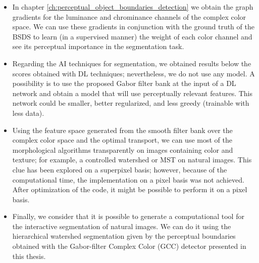 \begin{itemize}
	 \item In chapter \ref{ch:perceptual_object_boundaries_detection} we obtain the graph gradients for the luminance and chrominance channels of the complex color space. We can use these gradients in conjunction with the ground truth of the BSDS to learn (in a supervised manner) the weight of each color channel and see its perceptual importance in the segmentation task.
	 
	 \item Regarding the AI techniques for segmentation, we obtained results below the scores obtained with DL techniques; nevertheless, we do not use any model. A possibility is to use the proposed Gabor filter bank at the input of a DL network and obtain a model that will use perceptually relevant features. This network could be smaller, better regularized, and less greedy (trainable with less data).
	 
	 \item Using the feature space generated from the smooth filter bank over the complex color space and the optimal transport, we can use most of the morphological algorithms transparently on images containing color and texture; for example, a controlled watershed or MST on natural images. This clue has been explored on a superpixel basis; however, because of the computational time, the implementation on a pixel basis was not achieved. After optimization of the code, it might be possible to perform it on a pixel basis.

	 \item Finally, we consider that it is possible to generate a computational tool for the interactive segmentation of natural images. We can do it using the hierarchical watershed segmentation given by the perceptual boundaries obtained with the Gabor-filter Complex Color (GCC) detector presented in this thesis.
\end{itemize}


